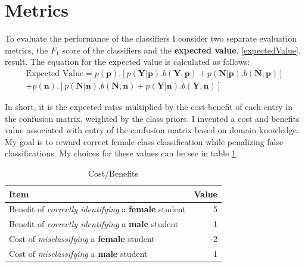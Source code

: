 \section*{Metrics}

To evaluate the performance of the classifiers I consider two separate evaluation metrics, the $F_1$ score of the classifiers and the \textbf{expected value}, \ref{expectedValue}, result. The equation for the expected value is calculated as follows:
\begin{equation}
\begin{aligned}
\mbox{Expected Value} = p(\mathbf{p}).[p(\mathbf{Y}|\mathbf{p}). b(\mathbf{Y},\mathbf{p}) + p(\mathbf{N}|\mathbf{p}). b(\mathbf{N},\mathbf{p})] \\
+ p(\mathbf{n}).[p(\mathbf{N}|\mathbf{n}). b(\mathbf{N},\mathbf{n}) + 
p(\mathbf{Y}|\mathbf{n}). b(\mathbf{Y},\mathbf{n})]
\end{aligned}
\end{equation}

In short, it is the expected rates multiplied by the cost-benefit of each entry in the confusion matrix, weighted by the class priors. I invented a cost and benefits value associated with entry of the confusion matrix based on domain knowledge. My goal is to reward correct female class classification while penalizing false classifications. My choices for these values can be see in table \ref{tableCostBenefit}. 

\setlength{\extrarowheight}{1.5pt}
\begin{table}[!htbp]
\caption{Cost/Benefits} %
\centering %
\begin{tabular}{|l|r|} %
\hline %

\hline
Item & Value\\[0.5ex]
\hline %

Benefit of \textit{correctly identifying} a \textbf{female} student  & 5  \\
Benefit of \textit{correctly identifying} a \textbf{male} student   & 1  \\
Cost of \textit{misclassifying} a \textbf{female} student  & -2  \\
Cost of \textit{misclassifying} a \textbf{male} student  & 1  \\

\hline%
\end{tabular}
\label{tableCostBenefit}{}
\end{table}

